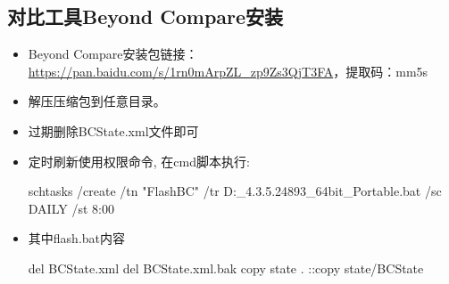 \subsection{对比工具Beyond Compare安装}
\begin{itemize}
\item Beyond Compare安装包链接：\url{https://pan.baidu.com/s/1rn0mArpZL_zp9Zs3QjT3FA}，提取码：mm5s
\item 解压压缩包到任意目录。
\item 过期删除BCState.xml文件即可
\item 定时刷新使用权限命令, 在cmd脚本执行:
\begin{commandbox}
schtasks /create /tn "FlashBC" /tr D:\BeyondCompare_4.3.5.24893_64bit_Portable\flash.bat /sc DAILY /st 8:00
\end{commandbox}
\item 其中flash.bat内容
\begin{messagebox}
del BCState.xml
del BCState.xml.bak
copy state\* .
::copy state/BCState
\end{messagebox}
\end{itemize}


